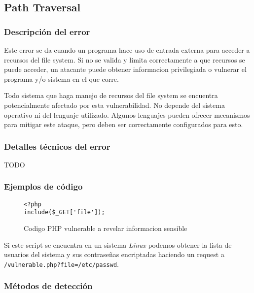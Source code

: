 \subsection{Path Traversal}

\subsubsection{Descripción del error}

Este error se da cuando un programa hace uso de entrada externa para acceder a recursos del file system.
Si no se valida y limita correctamente a que recursos se puede acceder, un atacante puede obtener informacion privilegiada o vulnerar el programa y/o sistema en el que corre.

Todo sistema que haga manejo de recursos del file system se encuentra potencialmente afectado por esta vulnerabilidad.
No depende del sistema operativo ni del lenguaje utilizado.
Algunos lenguajes pueden ofrecer mecanismos para mitigar este ataque, pero deben ser correctamente configurados para esto.

\subsubsection{Detalles técnicos del error}

TODO

\subsubsection{Ejemplos de código}

\begin{figure}[H]

    \begin{lstlisting}
<?php
include($_GET['file']);
    \end{lstlisting}

    \caption{Codigo PHP vulnerable a revelar informacion sensible}
    \label{code:php-traversal}

\end{figure}

Si este script se encuentra en un sistema \textit{Linux} podemos obtener la lista de usuarios del sistema y sus contraseñas encriptadas haciendo un request a \texttt{/vulnerable.php?file=/etc/passwd}.

\subsubsection{Métodos de detección}

